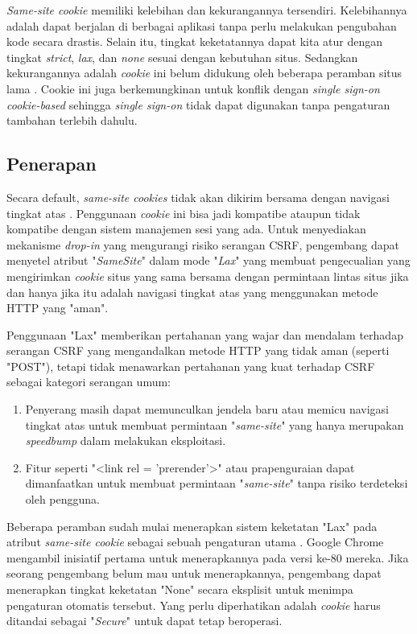 \documentclass{article}
\begin{document}
\textit{Same-site cookie} memiliki kelebihan dan kekurangannya tersendiri. Kelebihannya adalah dapat berjalan di berbagai aplikasi tanpa perlu melakukan pengubahan kode secara drastis. Selain itu, tingkat keketatannya dapat kita atur dengan tingkat \textit{strict}, \textit{lax}, dan \textit{none} sesuai dengan kebutuhan situs. Sedangkan kekurangannya adalah \textit{cookie} ini belum didukung oleh beberapa peramban situs lama \cite{CanIuseS40:online,ietf-httpbis-rfc6265bis-07}. Cookie ini juga berkemungkinan untuk konflik dengan \textit{single sign-on cookie-based} sehingga \textit{single sign-on} tidak dapat digunakan tanpa pengaturan tambahan terlebih dahulu.

\subsection{Penerapan}
Secara default, \textit{same-site cookies} tidak akan dikirim bersama dengan navigasi tingkat atas \cite{ietf-httpbis-cookie-same-site-00}. Penggunaan \textit{cookie} ini bisa jadi kompatibe ataupun tidak kompatibe dengan sistem manajemen sesi yang ada. Untuk menyediakan mekanisme \textit{drop-in} yang mengurangi risiko serangan CSRF, pengembang dapat menyetel atribut "\textit{SameSite}" dalam mode "\textit{Lax}" yang membuat pengecualian yang mengirimkan \textit{cookie} situs yang sama bersama dengan permintaan lintas situs jika dan hanya jika itu adalah navigasi tingkat atas yang menggunakan metode HTTP yang "aman".

Penggunaan "Lax" memberikan pertahanan yang wajar dan mendalam terhadap serangan CSRF yang mengandalkan metode HTTP yang tidak aman (seperti "POST"), tetapi tidak menawarkan pertahanan yang kuat terhadap CSRF sebagai kategori serangan umum:
\begin{enumerate}
\item Penyerang masih dapat memunculkan jendela baru atau memicu navigasi tingkat atas untuk membuat permintaan "\textit{same-site}" yang hanya merupakan \textit{speedbump} dalam melakukan eksploitasi.
\item Fitur seperti "<link rel = 'prerender'>" atau prapenguraian dapat dimanfaatkan untuk membuat permintaan "\textit{same-site}" tanpa risiko terdeteksi oleh pengguna.
\end{enumerate}

Beberapa peramban sudah mulai menerapkan sistem keketatan "Lax" pada atribut \textit{same-site cookie} sebagai sebuah pengaturan utama \cite{calzavara2020security}. Google Chrome mengambil inisiatif pertama untuk menerapkannya pada versi ke-80 mereka. Jika seorang pengembang belum mau untuk menerapkannya, pengembang dapat menerapkan tingkat keketatan "None" secara eksplisit untuk menimpa pengaturan otomatis tersebut. Yang perlu diperhatikan adalah \textit{cookie} harus ditandai sebagai "\textit{Secure}" untuk dapat tetap beroperasi.
\end{document}
